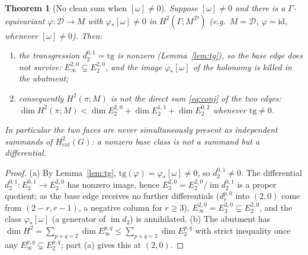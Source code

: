 \documentclass[11pt]{article}
\newtheorem{theorem}{Theorem}
\theoremstyle{definition}
\newcommand{\id}{\mathrm{id}}
\newcommand{\D}{\mathcal{D}}
\newcommand{\tg}{\mathrm{tg}}
\newcommand{\im}{\operatorname{im}}
\begin{document}
\begin{theorem}[{No clean sum when $[\omega]\neq0$}]\label{thm:nogo}
Suppose $[\omega]\neq0$ and there is a $\Gamma$-equivariant $\varphi\colon\D\to M$ with
$\varphi_*[\omega]\neq0$ in $H^2(\Gamma;M^\D)$ \textup{(}e.g.\ $M=\D$, $\varphi=\id$,
whenever $[\omega]\neq0$\textup{)}. Then:
\begin{enumerate}
\item[\textup{(a)}] the transgression $d_2^{0,1}=\tg$ is nonzero
(Lemma~\ref{lem:tg}), so the base edge does not survive: $E_\infty^{2,0}\subsetneq
E_2^{2,0}$, and the image $\varphi_*[\omega]$ of the holonomy is \emph{killed} in the
abutment;
\item[\textup{(b)}] consequently $H^2(\pi;M)$ is \emph{not} the direct sum \eqref{eq:conj} of
the two edges: $\dim H^2(\pi;M)<\dim E_2^{2,0}+\dim E_2^{1,1}+\dim E_2^{0,2}$ whenever
$\tg\neq0$.
\end{enumerate}
In particular the two faces are \emph{never} simultaneously present as independent summands
of $H^2_{\mathrm{cat}}(G)$: a nonzero base class is not a summand but a differential.
\end{theorem}
\begin{proof}
(a) By Lemma~\ref{lem:tg}, $\tg(\varphi)=\varphi_*[\omega]\neq0$, so $d_2^{0,1}\neq0$. The
differential $d_2^{0,1}\colon E_2^{0,1}\to E_2^{2,0}$ has nonzero image, hence
$E_3^{2,0}=E_2^{2,0}/\im d_2^{0,1}$ is a proper quotient; as the base edge receives no
further differentials ($d_r^{p,0}$ into $(2,0)$ come from $(2-r,r-1)$, a negative column for
$r\ge3$), $E_\infty^{2,0}=E_3^{2,0}\subsetneq E_2^{2,0}$, and the class $\varphi_*[\omega]$
(a generator of $\im d_2$) is annihilated. (b) The abutment has
$\dim H^2=\sum_{p+q=2}\dim E_\infty^{p,q}\le\sum_{p+q=2}\dim E_2^{p,q}$ with strict
inequality once any $E_\infty^{p,q}\subsetneq E_2^{p,q}$; part (a) gives this at $(2,0)$.
\end{proof}
\end{document}
